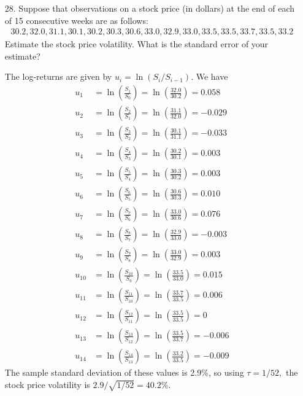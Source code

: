 \documentclass{article}
\begin{document}
\begin{itemize}
		\newpage
	\item[28.] Suppose that observations on a stock price (in dollars) at the end of each of 15 consecutive weeks are as follows:
		\begin{align*}
			30.2, 32.0, 31.1, 30.1, 30.2, 30.3, 30.6, 33.0, 32.9, 33.0, 33.5, 33.5, 33.7, 33.5, 33.2
		\end{align*}
		Estimate the stock price volatility. What is the standard error of your estimate?
		\begin{soln}
			The log-returns are given by $u_i=\ln(S_i/S_{i-1}).$ We have
			\begin{align*}
				u_1 &= \ln\left( \frac{S_1}{S_0} \right) = \ln\left( \frac{32.0}{30.2} \right) = 0.058 \\
				u_2 &= \ln\left( \frac{S_2}{S_1} \right) = \ln\left( \frac{31.1}{32.0} \right) = -0.029 \\
				u_3 &= \ln\left( \frac{S_3}{S_2} \right) = \ln\left( \frac{30.1}{31.1} \right) = -0.033 \\
				u_4 &= \ln\left( \frac{S_4}{S_3} \right)=\ln\left(\frac{30.2}{30.1} \right) = 0.003 \\
				u_5 &= \ln\left( \frac{S_5}{S_4} \right) = \ln\left( \frac{30.3}{30.2} \right) = 0.003 \\
				u_6 &= \ln\left( \frac{S_6}{S_5} \right) = \ln\left( \frac{30.6}{30.3} \right) = 0.010 \\
				u_7 &= \ln\left( \frac{S_7}{S_6} \right) = \ln\left( \frac{33.0}{30.6} \right) = 0.076 \\
				u_8 &= \ln\left( \frac{S_8}{S_7} \right) = \ln\left( \frac{32.9}{33.0} \right) = -0.003 \\
				u_9 &= \ln\left( \frac{S_9}{S_8} \right) = \ln\left( \frac{33.0}{32.9} \right) = 0.003 \\
				u_{10} &= \ln\left( \frac{S_{10}}{S_9} \right) = \ln\left( \frac{33.5}{33.0} \right) = 0.015 \\
				u_{11} &= \ln\left( \frac{S_{11}}{S_{10}} \right) = \ln\left( \frac{33.7}{33.5} \right) = 0.006 \\
				u_{12} &= \ln\left( \frac{S_{12}}{S_{11}} \right) = \ln\left( \frac{33.5}{33.5} \right) = 0 \\
				u_{13} &= \ln\left( \frac{S_{13}}{S_{12}} \right) = \ln\left( \frac{33.5}{33.7} \right) = -0.006 \\
				u_{14} &= \ln\left( \frac{S_{14}}{S_{13}} \right) = \ln\left( \frac{33.2}{33.5} \right) = -0.009
			\end{align*}
			The sample standard deviation of these values is 2.9\%, so using $\tau=1/52,$ the stock price volatility is $2.9/\sqrt{1/52} = 40.2\%.$
		\end{soln}
	
\end{itemize}
\end{document}
